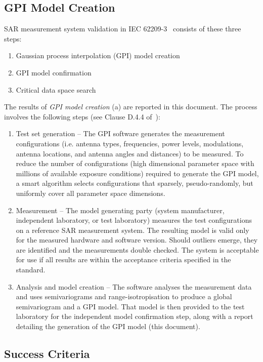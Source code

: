 \documentclass{article}
\begin{document}
\subsection{GPI Model Creation}\label{sec:procedure}
SAR measurement system validation in IEC 62209-3~\cite{standard} consists of these three steps:

\begin{enumerate}[label=\alph*)]
\item Gaussian process interpolation (GPI) model creation
\item GPI model confirmation
\item Critical data space search
\end{enumerate}

The results of \textit{GPI model creation} (a) are reported in this document. The process involves the following steps (see Clause D.4.4 of~\cite{standard}):

\begin{enumerate}[label=\arabic*)]
\item Test set generation -- The GPI software generates the measurement configurations (i.e. antenna types, frequencies, power levels, modulations, antenna locations, and antenna angles and distances) to be measured. To reduce the number of configurations (high dimensional parameter space with  millions of available exposure conditions) required to generate the GPI model, a smart algorithm selects configurations that sparsely, pseudo-randomly, but uniformly cover all parameter space dimensions.
\item Measurement -- The model generating party (system manufacturer, independent laboratory, or test laboratory) measures the test configurations on a reference SAR measurement system. The resulting model is valid only for the measured hardware and software version. Should outliers emerge, they are identified and the measurements double checked. The system is acceptable for use if all results are within the acceptance criteria specified in the standard.
\item Analysis and model creation -- The software analyses the measurement data and uses semivariograms and range-isotropisation to produce a global semivariogram and a GPI model. That model is then provided to the test laboratory for the independent model confirmation step, along with a report detailing the generation of the GPI model (this document).
\end{enumerate}

\subsection{Success Criteria}\label{sec:quantities}
\end{document}
